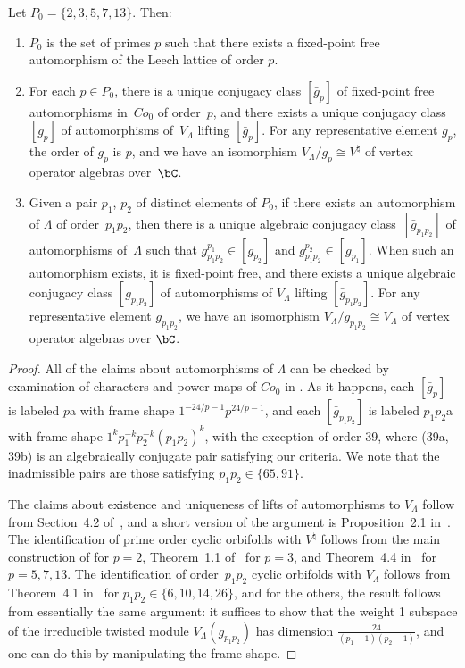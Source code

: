 \begin{lem} \label{lem:cyclic-leech-orbifolds} Let $P_0 = \{ 2,3,5,7,13\}$. Then:
\begin{enumerate}\itemsep=0pt
\item[$1.$] $P_0$ is the set of primes $p$ such that there exists a fixed-point free automorphism of the Leech lattice of order $p$.
\item[$2.$] For each $p \in P_0$, there is a unique conjugacy class $[\bar{g}_p]$ of fixed-point free automorphisms in~$Co_0$ of order~$p$, and there exists a unique conjugacy class $[g_p]$ of automorphisms of~$V_\Lambda$ lifting $[\bar{g}_p]$. For any representative element $g_p$, the order of $g_p$ is $p$, and we have an isomorphism $V_\Lambda/g_p \cong V^\natural$ of vertex operator algebras over~$\bC$.
\item[$3.$] Given a pair $p_1$, $p_2$ of distinct elements of $P_0$, if there exists an automorphism of $\Lambda$ of order~$p_1p_2$, then there is a unique algebraic conjugacy class~$[\bar{g}_{p_1p_2}]$ of automorphisms of~$\Lambda$ such that $\bar{g}_{p_1p_2}^{p_1} \in [\bar{g}_{p_2}]$ and $\bar{g}_{p_1p_2}^{p_2} \in [\bar{g}_{p_1}]$. When such an automorphism exists, it is fixed-point free, and there exists a unique algebraic conjugacy class $[g_{p_1p_2}]$ of automorphisms of $V_\Lambda$ lifting $[\bar{g}_{p_1p_2}]$. For any representative element $g_{p_1p_2}$, we have an isomorphism $V_\Lambda/g_{p_1p_2} \cong V_\Lambda$ of vertex operator algebras over $\bC$.
\end{enumerate}
\end{lem}
\begin{proof}All of the claims about automorphisms of $\Lambda$ can be checked by examination of characters and power maps of $Co_0$ in \cite{GAP}. As it happens, each $[\bar{g}_p]$ is labeled $p$a with frame shape $1^{-24/p-1}p^{24/p-1}$, and each $[\bar{g}_{p_1p_2}]$ is labeled $p_1p_2$a with frame shape $1^kp_1^{-k}p_2^{-k}(p_1p_2)^k$, with the exception of order 39, where (39a, 39b) is an algebraically conjugate pair satisfying our criteria. We note that the inadmissible pairs are those satisfying $p_1p_2 \in \{ 65, 91\}$.

The claims about existence and uniqueness of lifts of automorphisms to $V_\Lambda$ follow from Section~4.2 of~\cite{LS17}, and a short version of the argument is Proposition~2.1 in~\cite{C17}. The identification of prime order cyclic orbifolds with $V^\natural$ follows from the main construction of \cite{FLM88} for $p=2$, Theorem~1.1 of~\cite{CLS16} for $p=3$, and Theorem~4.4 in~\cite{ALY17} for $p=5,7,13$. The identification of order~$p_1p_2$ cyclic orbifolds with $V_\Lambda$ follows from Theorem~4.1 in~\cite{ALY17} for $p_1p_2 \in \{6,10,14,26 \}$, and for the others, the result follows from essentially the same argument: it suffices to show that the weight 1 subspace of the irreducible twisted module $V_\Lambda(g_{p_1p_2})$ has dimension $\frac{24}{(p_1-1)(p_2-1)}$, and one can do this by manipulating the frame shape.
\end{proof}

